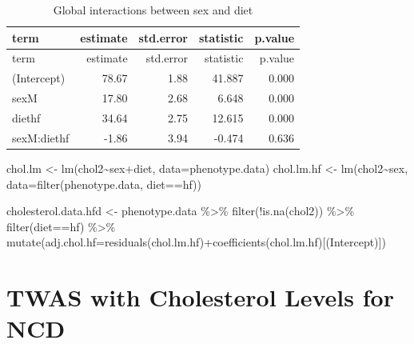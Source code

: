 \documentclass[
]{article}
\newenvironment{Shaded}{\begin{snugshade}}{\end{snugshade}}
\newcommand{\AttributeTok}[1]{\textcolor[rgb]{0.77,0.63,0.00}{#1}}
\newcommand{\FunctionTok}[1]{\textcolor[rgb]{0.00,0.00,0.00}{#1}}
\newcommand{\NormalTok}[1]{#1}
\newcommand{\OtherTok}[1]{\textcolor[rgb]{0.56,0.35,0.01}{#1}}
\newcommand{\SpecialCharTok}[1]{\textcolor[rgb]{0.00,0.00,0.00}{#1}}
\newcommand{\StringTok}[1]{\textcolor[rgb]{0.31,0.60,0.02}{#1}}
\begin{document}
\begin{longtable}[]{@{}lrrrr@{}}
\caption{Global interactions between sex and diet}\tabularnewline
\toprule()
term & estimate & std.error & statistic & p.value \\
\midrule()
\endfirsthead
\toprule()
term & estimate & std.error & statistic & p.value \\
\midrule()
\endhead
(Intercept) & 78.67 & 1.88 & 41.887 & 0.000 \\
sexM & 17.80 & 2.68 & 6.648 & 0.000 \\
diethf & 34.64 & 2.75 & 12.615 & 0.000 \\
sexM:diethf & -1.86 & 3.94 & -0.474 & 0.636 \\
\bottomrule()
\end{longtable}

\begin{Shaded}
\begin{Highlighting}[]
\NormalTok{chol.lm }\OtherTok{\textless{}{-}} \FunctionTok{lm}\NormalTok{(chol2}\SpecialCharTok{\textasciitilde{}}\NormalTok{sex}\SpecialCharTok{+}\NormalTok{diet, }\AttributeTok{data=}\NormalTok{phenotype.data)}
\NormalTok{chol.lm.hf }\OtherTok{\textless{}{-}} \FunctionTok{lm}\NormalTok{(chol2}\SpecialCharTok{\textasciitilde{}}\NormalTok{sex, }\AttributeTok{data=}\FunctionTok{filter}\NormalTok{(phenotype.data, diet}\SpecialCharTok{==}\StringTok{\textquotesingle{}hf\textquotesingle{}}\NormalTok{))}

\NormalTok{cholesterol.data.hfd }\OtherTok{\textless{}{-}}
\NormalTok{  phenotype.data }\SpecialCharTok{\%\textgreater{}\%}
    \FunctionTok{filter}\NormalTok{(}\SpecialCharTok{!}\FunctionTok{is.na}\NormalTok{(chol2)) }\SpecialCharTok{\%\textgreater{}\%}
  \FunctionTok{filter}\NormalTok{(diet}\SpecialCharTok{==}\StringTok{\textquotesingle{}hf\textquotesingle{}}\NormalTok{) }\SpecialCharTok{\%\textgreater{}\%}
  \FunctionTok{mutate}\NormalTok{(}\AttributeTok{adj.chol.hf=}\FunctionTok{residuals}\NormalTok{(chol.lm.hf)}\SpecialCharTok{+}\FunctionTok{coefficients}\NormalTok{(chol.lm.hf)[}\StringTok{\textquotesingle{}(Intercept)\textquotesingle{}}\NormalTok{])}
\end{Highlighting}
\end{Shaded}

\hypertarget{twas-with-cholesterol-levels-for-ncd}{%
\section{TWAS with Cholesterol Levels for
NCD}\label{twas-with-cholesterol-levels-for-ncd}}
\end{document}
